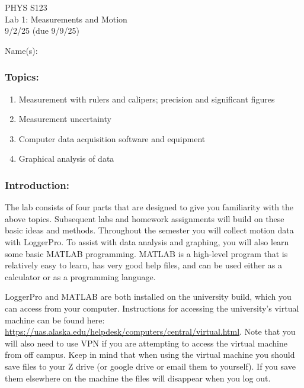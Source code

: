 \documentclass[11pt,letterpaper]{article}
\begin{document}
\setlength{\parindent}{0in}

\begin{flushright}
PHYS S123\\
Lab 1: Measurements and Motion\\
9/2/25 (due 9/9/25)
\end{flushright}

Name(s):\\


\subsubsection*{Topics:}
\begin{enumerate}
\setlength{\parskip}{3pt}
\item Measurement with rulers and calipers; precision and significant figures
\item Measurement uncertainty
\item Computer data acquisition software and equipment
\item Graphical analysis of data
\end{enumerate}

\subsubsection*{Introduction:}
The lab consists of four parts that are designed to give you familiarity with the above topics. Subsequent labs and homework assignments will build on these basic ideas and methods. Throughout the semester you will collect motion data with LoggerPro. To assist with data analysis and graphing, you will also learn some basic MATLAB programming. MATLAB is a high-level program that is relatively easy to learn, has very good help files, and can be used either as a calculator or as a programming language. 

LoggerPro and MATLAB are both installed on the university build, which you can access from your computer. Instructions for accessing the university's virtual machine can be found here: \url{https://uas.alaska.edu/helpdesk/computers/central/virtual.html}. Note that you will also need to use VPN if you are attempting to access the virtual machine from off campus.
Keep in mind that when using the virtual machine you should save files to your Z drive (or google drive or email them to yourself). If you save them elsewhere on the machine the files will disappear when you log out.
\end{document}
